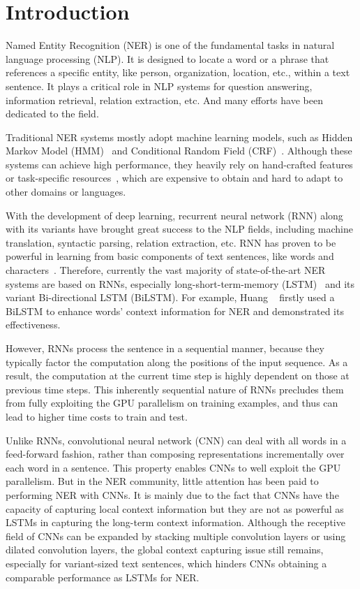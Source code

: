 \documentclass[letterpaper]{article} \usepackage{aaai19}  \usepackage{times}  \usepackage{helvet}  \usepackage{courier}  \usepackage{url}  \usepackage{graphicx}  \usepackage{amsmath}
\newcommand{\etal}{\text{et al.}}
\begin{document}
\section{Introduction}
Named Entity Recognition (NER) is one of the fundamental tasks in natural language processing (NLP). It is designed to locate a word or a phrase that references a specific entity, like person, organization, location, etc., within a text sentence. It plays a critical role in NLP systems for question answering, information retrieval, relation extraction, etc. And many efforts have been dedicated to the field.

Traditional NER systems mostly adopt machine learning models, such as Hidden Markov Model (HMM)~\cite{bikel1997nymble} and Conditional Random Field (CRF)~\cite{mccallum2003early}. Although these systems can achieve high performance, they heavily rely on hand-crafted features or task-specific resources~\cite{ma2016CNNBLSTMCRF}, which are expensive to obtain and hard to adapt to other domains or languages.

With the development of deep learning, recurrent neural network (RNN) along with its variants have brought great success to the NLP fields, including machine translation, syntactic parsing, relation extraction, etc. RNN has proven to be powerful in learning from basic components of text sentences, like words and characters~\cite{tran2017named}. Therefore, currently the vast majority of state-of-the-art NER systems are based on RNNs, especially long-short-term-memory (LSTM)~\cite{hochreiter1997long} and its variant Bi-directional LSTM (BiLSTM). For example, Huang \etal~ firstly used a BiLSTM to enhance words' context information for NER and demonstrated its effectiveness. 

However, RNNs process the sentence in a sequential manner, because they typically factor the computation along the positions of the input sequence. As a result, the computation at the current time step is highly dependent on those at previous time steps. This inherently sequential nature of RNNs precludes them from fully exploiting the GPU parallelism on training examples, and thus can lead to higher time costs to train and test.

Unlike RNNs, convolutional neural network (CNN) can deal with all words in a feed-forward fashion, rather than composing representations incrementally over each word in a sentence. This property enables CNNs to well exploit the GPU parallelism. But in the NER community, little attention has been paid to performing NER with CNNs. It is mainly due to the fact that CNNs have the capacity of capturing local context information but they are not as powerful as LSTMs in capturing the long-term context information. Although the receptive field of CNNs can be expanded by stacking multiple convolution layers or using dilated convolution layers, the global context capturing issue still remains, especially for variant-sized text sentences, which hinders CNNs obtaining a comparable performance as LSTMs for NER.
\end{document}
